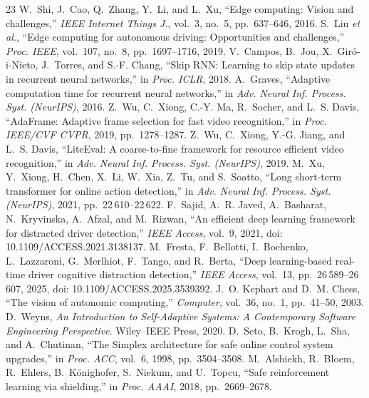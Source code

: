 \documentclass[conference]{IEEEtran}
\begin{document}
\begin{thebibliography}{23}
 W.~Shi, J.~Cao, Q.~Zhang, Y.~Li, and L.~Xu, ``Edge
computing: Vision and challenges,'' \emph{IEEE Internet Things J.},
vol.~3, no.~5, pp.~637--646, 2016.
 S.~Liu \emph{et al.}, ``Edge computing for
autonomous driving: Opportunities and challenges,'' \emph{Proc. IEEE},
vol.~107, no.~8, pp.~1697--1716, 2019.
 V.~Campos, B.~Jou, X.~Gir\'o-i-Nieto,
J.~Torres, and S.-F. Chang, ``Skip RNN: Learning to skip state updates in
recurrent neural networks,'' in \emph{Proc. ICLR}, 2018.
 A.~Graves, ``Adaptive computation time for
recurrent neural networks,'' in \emph{Adv. Neural Inf. Process. Syst.
(NeurIPS)}, 2016.
 Z.~Wu, C.~Xiong, C.-Y. Ma, R.~Socher, and
L.~S. Davis, ``AdaFrame: Adaptive frame selection for fast video
recognition,'' in \emph{Proc. IEEE/CVF CVPR}, 2019, pp.~1278--1287.
 Z.~Wu, C.~Xiong, Y.-G. Jiang, and L.~S. Davis,
``LiteEval: A coarse-to-fine framework for resource efficient video
recognition,'' in \emph{Adv. Neural Inf. Process. Syst. (NeurIPS)}, 2019.
 M.~Xu, Y.~Xiong, H.~Chen, X.~Li, W.~Xia, Z.~Tu, and
S.~Soatto, ``Long short-term transformer for online action detection,''
in \emph{Adv. Neural Inf. Process. Syst. (NeurIPS)}, 2021,
pp.~22\,610--22\,622.
F.~Sajid, A.~R. Javed, A.~Basharat, N.~Kryvinska, A.~Afzal,
and M.~Rizwan, ``An efficient deep learning framework for distracted
driver detection,'' \emph{IEEE Access}, vol.~9, 2021,
doi: 10.1109/ACCESS.2021.3138137.
M.~Fresta, F.~Bellotti, I.~Bochenko, L.~Lazzaroni, G.~Merlhiot,
F.~Tango, and R.~Berta,
``Deep learning-based real-time driver cognitive distraction detection,''
\emph{IEEE Access}, vol.~13, pp.~26\,589--26\,607, 2025,
doi: 10.1109/ACCESS.2025.3539392.
 J.~O. Kephart and D.~M. Chess, ``The vision of
autonomic computing,'' \emph{Computer}, vol.~36, no.~1, pp.~41--50, 2003.
 D.~Weyns, \emph{An Introduction to Self-Adaptive
Systems: A Contemporary Software Engineering Perspective}. Wiley--IEEE
Press, 2020.
 D.~Seto, B.~Krogh, L.~Sha, and A.~Chutinan,
``The Simplex architecture for safe online control system upgrades,'' in
\emph{Proc. ACC}, vol.~6, 1998, pp.~3504--3508.
 M.~Alshiekh, R.~Bloem, R.~Ehlers,
B.~K\"onighofer, S.~Niekum, and U.~Topcu, ``Safe reinforcement learning
via shielding,'' in \emph{Proc. AAAI}, 2018, pp.~2669--2678.

\end{thebibliography}
\end{document}
